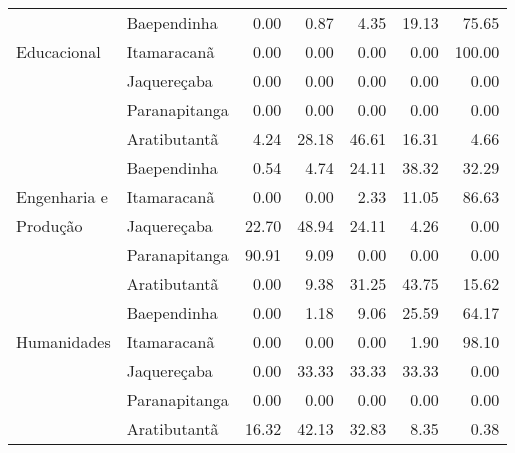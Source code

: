 \begin{table}[ht]
\begin{tabular}{ll rrrrr}
                          & Baependinha             &               0.00 &         0.87 &        4.35 &      19.13 &            75.65 \\ 
   Educacional            & Itamaracanã             &               0.00 &         0.00 &        0.00 &       0.00 &           100.00 \\ 
                          & Jaquereçaba             &               0.00 &         0.00 &        0.00 &       0.00 &             0.00 \\ 
                          & Paranapitanga           &               0.00 &         0.00 &        0.00 &       0.00 &             0.00 \\ 
 \midrule{}
						  & Aratibutantã            &               4.24 &        28.18 &       46.61 &      16.31 &             4.66 \\ 
                          & Baependinha             &               0.54 &         4.74 &       24.11 &      38.32 &            32.29 \\ 
  Engenharia e            & Itamaracanã             &               0.00 &         0.00 &        2.33 &      11.05 &            86.63 \\ 
  Produção                & Jaquereçaba             &              22.70 &        48.94 &       24.11 &       4.26 &             0.00 \\ 
                          & Paranapitanga           &              90.91 &         9.09 &        0.00 &       0.00 &             0.00 \\ 
 \midrule{}
						  & Aratibutantã            &               0.00 &         9.38 &       31.25 &      43.75 &            15.62 \\ 
                          & Baependinha             &               0.00 &         1.18 &        9.06 &      25.59 &            64.17 \\ 
  Humanidades             & Itamaracanã             &               0.00 &         0.00 &        0.00 &       1.90 &            98.10 \\ 
                          & Jaquereçaba             &               0.00 &        33.33 &       33.33 &      33.33 &             0.00 \\ 
                          & Paranapitanga           &               0.00 &         0.00 &        0.00 &       0.00 &             0.00 \\ 
 \midrule{}
						  & Aratibutantã            &              16.32 &        42.13 &       32.83 &       8.35 &             0.38 \\ 

\end{tabular}
\end{table}
